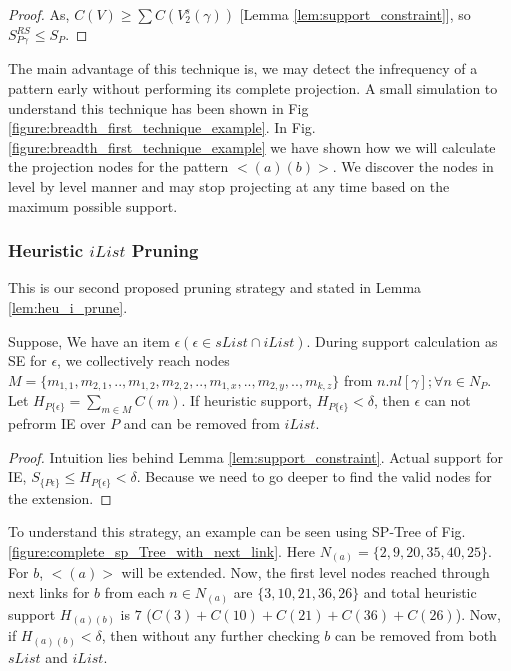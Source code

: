 \begin{proof}
     As, $C(V) \geq \sum C(V_{2}^{s}(\gamma))$ [Lemma \ref{lem:support_constraint}], so $S^{RS}_{P\gamma} \leq S_{P}$. 
\end{proof}


The main advantage of this technique is, we may detect the infrequency of a pattern early without performing its complete projection. A small simulation to understand this technique has been shown in Fig \ref{figure:breadth_first_technique_example}. In Fig. \ref{figure:breadth_first_technique_example} we have shown how we will calculate the projection nodes for the pattern $< (a)(b) >$. We discover the nodes in level by level manner and may stop projecting at any time based on the maximum possible support.



\subsubsection{Heuristic $iList$ Pruning} \label{section:heuristic_pruning}
This is our second proposed pruning strategy and stated in Lemma \ref{lem:heu_i_prune}. 
\begin{lem} \label{lem:heu_i_prune}
   Suppose, We have an item $\epsilon(\epsilon \in sList \cap iList)$. During support calculation as SE for $\epsilon$, we collectively reach nodes $M=\{m_{1,1},m_{2,1},..,m_{1,2},m_{2,2},..,m_{1,x},..,m_{2,y},..,m_{k,z}\}$ from $n.nl[\gamma]; \forall n \in N_{P}$. Let $H_{P\{\epsilon\}}= \sum_{m \in M} C(m)$. If heuristic support, $H_{P\{\epsilon\}} <  \delta$, then $\epsilon$ can not pefrorm IE over $P$ and can be removed from $iList$.
\end{lem}
\begin{proof}
    Intuition lies behind Lemma \ref{lem:support_constraint}. Actual support for IE, $S_{\{P\epsilon\}} \leq H_{P\{\epsilon\}} < \delta$. Because we need to go deeper to find the valid nodes for the extension. 
\end{proof}

To understand this strategy, an example can be seen using SP-Tree of Fig. \ref{figure:complete_sp_Tree_with_next_link}. Here $N_{(a)}=\{2, 9, 20, 35, 40, 25\}$. For $b$, $< (a) >$ will be extended. Now, the first level nodes reached through next links for $b$ from each $n \in N_{(a)}$ are $\{3, 10, 21, 36, 26\}$ and total heuristic support $H_{(a)(b)}$ is $7$ ($C(3)+C(10)+C(21)+C(36)+C(26)$). Now, if $H_{(a)(b)} < \delta$, then without any further checking $b$ can be removed from both $sList$ and $iList$.


